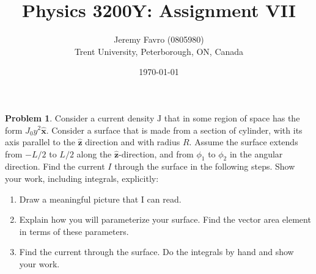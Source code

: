 \documentclass[10pt]{article}
\title{Physics 3200Y: Assignment VII}
\author{Jeremy Favro (0805980) \\ Trent University, Peterborough, ON, Canada}
\date{\today}
\theoremstyle{definition}
\newtheorem{problem}{Problem}
\newcommand{\ux}{\hat{\mathbf{x}}}
\newcommand{\uz}{\hat{\mathbf{z}}}
\newcommand{\bv}[1]{\bm{\mathrm{#1}}}
\begin{document}
\maketitle

\begin{problem}
Consider a current density $\bv{J}$ that in some region of space has the form $J_0y^2\ux$. Consider a surface that is made
from a section of cylinder, with its axis parallel to the $\uz$ direction and with radius $R$. Assume the surface extends
from $-L/2$ to $L/2$ along the $\uz$-direction, and from $\phi_1$ to $\phi_2$ in the angular direction. Find the current $I$ through
the surface in the following steps. Show your work, including integrals, explicitly:
\begin{enumerate}[label=(\alph*)]
  \item Draw a meaningful picture that I can read.
  \item Explain how you will parameterize your surface. Find the vector area element in terms of these parameters.
  \item Find the current through the surface. Do the integrals by hand and show your work.
\end{enumerate}
\end{problem}
\end{document}
